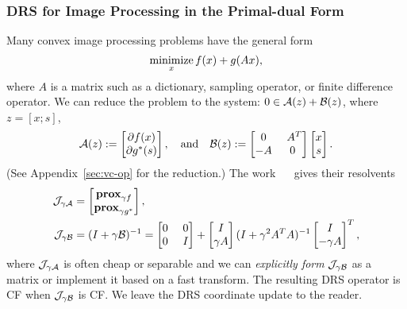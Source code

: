 \subsubsection{DRS for Image Processing in the Primal-dual Form \cite{o2014primal}}
 Many convex image processing problems have the general form
$$\operatorname*{minimize}_{x} f(x) + g(Ax),$$
where $A$ is a matrix such as a dictionary, sampling operator, or finite difference operator. We can reduce the problem to the system: $0\in{\mathcal{A}}(z) + {\mathcal{B}}(z)$, where $z=[x;s]$,
$$\cA(z):=\begin{bmatrix}\partial f(x)\\\partial g^*(s)\end{bmatrix},\quad\mbox{and}\quad \cB(z):=\begin{bmatrix}0 & ~A^T \\ -A & 0\end{bmatrix}\begin{bmatrix}x\\s\end{bmatrix}.$$
(See Appendix~\ref{sec:vc-op} for the reduction.) The work \mbox{%
\cite{o2014primal} }%
gives their resolvents    
\begin{align*}\cJ_{\gamma \cA} &= \begin{bmatrix}\prox_{\gamma f}\\\prox_{\gamma g^*}\end{bmatrix},\\ 
\cJ_{\gamma \cB} &= (I+\gamma \cB)^{-1}= \begin{bmatrix} 0 &~ 0 \\ 0 &~ I\end{bmatrix}+\begin{bmatrix}I\\ \gamma A\end{bmatrix}(I+\gamma^2 A^TA)^{-1}\begin{bmatrix}I\\ -\gamma A\end{bmatrix}^T,
\end{align*}
where ${\mathcal{J}}_{\gamma {\mathcal{A}}}$ is often cheap or separable and we can \emph{explicitly form}  ${\mathcal{J}}_{\gamma {\mathcal{B}}}$  as a matrix or implement it based on a fast transform. The resulting DRS operator is CF when ${\mathcal{J}}_{\gamma {\mathcal{B}}}$ is CF. We leave the DRS coordinate update to the reader.

